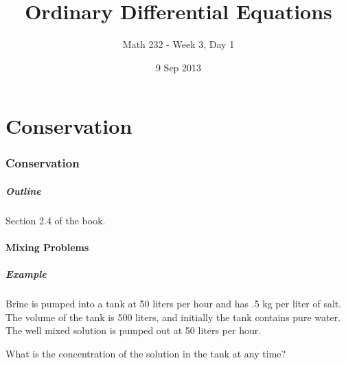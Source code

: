 \part{Conservation}
\section{Conservation}

\title{Ordinary Differential Equations}
\subtitle{Math 232 - Week 3, Day 1}
\date{9 Sep 2013}

\begin{frame}
  \titlepage
\end{frame}

\begin{frame}
  \frametitle{Outline}
  \tableofcontents[currentsection]

  Section 2.4 of the book.
\end{frame}


\subsection{Mixing Problems}


\begin{frame}
  \frametitle{Example}

  {\color{red}Brine is pumped into a tank at 50 liters per hour and has .5 kg per
  liter of salt.} {\color{blue}The volume of the tank is 500 liters, and initially
  the tank contains pure water.} {\color{purple}The well mixed solution is pumped out
  at 50 liters per hour.}

  What is the concentration of the solution in the tank at any time?

\end{frame}


